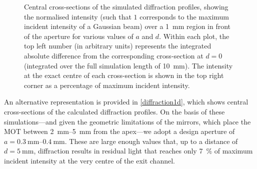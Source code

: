 \documentclass[../Thesis-IJspeert.tex]{subfiles}
\begin{document}
\begin{figure}[!t]
	\caption[Central cross-sections of the simulated diffraction profiles from a pyramidal-MOT mirror configuration]{Central cross-sections of the simulated diffraction profiles, showing the normalised intensity (such that $1$ corresponds to the maximum incident intensity of a Gaussian beam) over a \SI{1}{\milli\meter} region in front of the aperture for various values of $a$ and $d$. Within each plot, the top left number (in arbitrary units) represents the integrated absolute difference from the corresponding cross-section at $d=0$ (integrated over the full simulation length of \SI{10}{\milli\meter}). The intensity at the exact centre of each cross-section is shown in the top right corner as a percentage of maximum incident intensity.}
\label{diffraction1d}
\end{figure}
An alternative representation is provided in \autoref{diffraction1d}, which shows central cross-sections of the calculated diffraction profiles. On the basis of these simulations—and given the geometric limitations of the mirrors, which place the MOT between \SIrange{2}{5}{\milli\metre} from the apex—we adopt a design aperture of $a=\SIrange{0.3}{0.4}{\milli\metre}$. These are large enough values that, up to a distance of $d=\SI{5}{\milli\meter}$, diffraction results in residual light that reaches only \SI{7}{\percent} of maximum incident intensity at the very centre of the exit channel.
\end{document}
